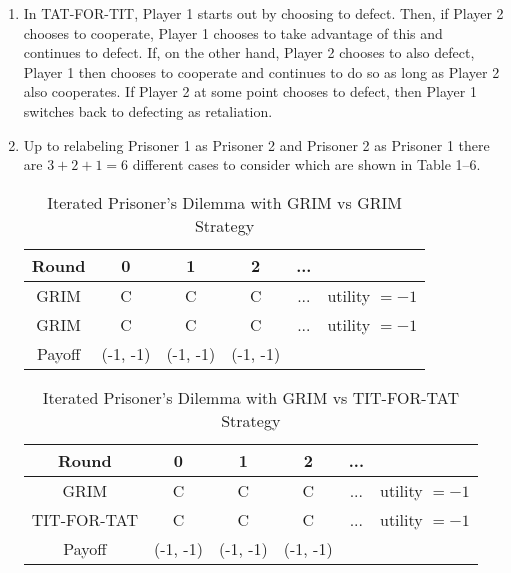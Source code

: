 \documentclass[a4paper]{article}
\begin{document}
\begin{exercise}{5}
  \begin{enumerate}[label=(\alph*)]
    \item In TAT-FOR-TIT, Player 1 starts out by choosing to defect. Then, if Player 2 chooses to cooperate, Player 1 chooses to take advantage of this and continues to defect. If, on the other hand, Player 2 chooses to also defect, Player 1 then chooses to cooperate and continues to do so as long as Player 2 also cooperates. If Player 2 at some point chooses to defect, then Player 1 switches back to defecting as retaliation.

    \item Up to relabeling Prisoner 1 as Prisoner 2 and Prisoner 2 as Prisoner 1 there are $ 3 + 2 + 1 = 6 $ different cases to consider which are shown in Table 1--6.
      \begin{table}[H]
        \centering
        \begin{tabular}{c c c c c c}
          \hline
          Round & 0 & 1 & 2 & ... & \\
          \hline
          GRIM   & C        & C        & C        & ... & utility $ =-1 $\\
          GRIM   & C        & C        & C        & ... & utility $ =-1 $\\
          Payoff & (-1, -1) & (-1, -1) & (-1, -1) &     & \\
          \hline
        \end{tabular}
        \caption{Iterated Prisoner's Dilemma with GRIM vs GRIM Strategy}
      \end{table}
      \begin{table}[H]
        \centering
        \begin{tabular}{c c c c c c}
          \hline
          Round & 0 & 1 & 2 & ... & \\
          \hline
          GRIM          & C        & C        & C        & ... & utility $ =-1 $\\
          TIT-FOR-TAT   & C        & C        & C        & ... & utility $ =-1 $\\
          Payoff        & (-1, -1) & (-1, -1) & (-1, -1) &     & \\
          \hline
        \end{tabular}
        \caption{Iterated Prisoner's Dilemma with GRIM vs TIT-FOR-TAT Strategy}
      \end{table}
      \begin{table}[H]
        \centering
        \begin{tabular}{c c c c c c c}

\end{tabular}
\end{table}
\end{enumerate}
\end{exercise}
\end{document}
